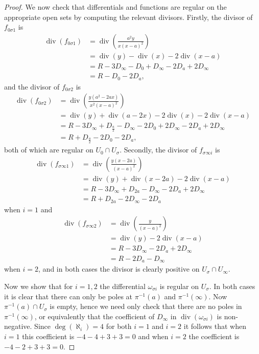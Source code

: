 \documentclass[draft, 11pt]{article} %
\theoremstyle{plain}
\theoremstyle{remark}
\DeclareMathOperator{\di}{div}
\begin{document}
\begin{proof}
We now check that differentials and functions are regular on the appropriate open sets by computing the relevant divisors.
Firstly, the divisor of $f_{0 \sigma 1}$ is
\begin{align*}
\di(f_{0 \sigma 1}) & = \di\left( \frac{a^2y}{x(x-a)^2} \right) \\ 
& = \di(y) - \di(x) - 2\di(x-a) \\
& = R - 3D_\infty - D_0 + D_\infty -2D_a +2D_\infty \\
& = R - D_0 - 2D_a,
\end{align*}
and the divisor of $f_{0 \sigma 2}$ is
\begin{align*}
\di(f_{0 \sigma 2} ) & = \di \left( \frac{y(a^2 - 2ax)}{x^2(x-a)^2} \right) \\
& = \di(y) + \di(a-2x) - 2\di(x) - 2\di(x-a) \\
& = R - 3D_\infty +D_{\frac{a}{2}} - D_\infty -2D_0 + 2D_\infty -2D_a + 2D_\infty \\
& = R + D_{\frac{a}{2}} - 2D_0 - 2D_a,
\end{align*}
both of which are regular on $U_0 \cap U_\sigma$.
Secondly, the divisor of  $f_{\sigma \infty i}$ is
\begin{align*}
\di(f_{\sigma \infty 1} ) & = \di \left( \frac{y(x-2a)}{(x-a)^2} \right) \\
& = \di(y) + \di(x-2a) - 2\di(x-a) \\
& = R - 3D_\infty + D_{2a} - D_\infty - 2D_a + 2D_\infty \\
& = R + D_{2a} -2D_\infty - 2D_a
\end{align*}
when $i=1$ and
\begin{align*}
\di( f_{\sigma \infty 2} ) & = \di \left( \frac{y}{(x-a)^2} \right) \\
& = \di (y)  - 2\di(x-a) \\
& = R - 3D_\infty  - 2D_a + 2D_\infty \\
& = R - 2D_a - D_\infty 
\end{align*}
when $i=2$, and in both cases the divisor is clearly positive on $U_\sigma \cap U_\infty$.

Now we show that for $i = 1, 2$ the differential $\omega_{\sigma i}$ is regular on $U_\sigma$.
In both cases it is clear that there can only be poles at $\pi^{-1}(a)$ and $\pi^{-1}(\infty)$.
Now $\pi^{-1}(a) \cap U_\sigma$ is empty, hence we need only check that there are no poles in $\pi^{-1}(\infty)$, or equivalently that the coefficient of $D_\infty$ in $\di( \omega_{\sigma i})$ is non-negative.
Since $\deg(\aleph_i) = 4$ for both $i=1$ and $i=2$ it follows that when $i=1$ this coefficient is $-4 - 4 + 3 + 3 = 0$ and when $i=2$ the coefficient is $-4 -2 +3 + 3=0$.


\end{proof}
\end{document}
